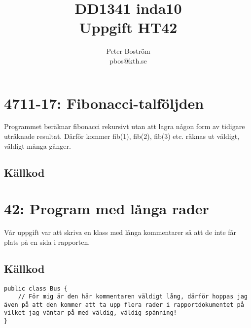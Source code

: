 \documentclass[a4paper]{article}
\author{Peter Boström \\ pbos@kth.se}
\title{DD1341 inda10 \\ Uppgift HT42}
\begin{document}
	\maketitle

	\section*{4711-17: Fibonacci-talföljden}
		Programmet beräknar fibonacci rekursivt utan att lagra någon form av tidigare uträknade resultat. Därför kommer fib(1), fib(2), fib(3) etc. räknas ut väldigt, väldigt många gånger.

		\subsection*{Källkod}

			
	\newpage
	\section*{42: Program med långa rader}
		Vår uppgift var att skriva en klass med långa kommentarer så att de inte får plats på en sida i rapporten.

		\subsection*{Källkod}
			\begin{lstlisting}
public class Bus {
	// För mig är den här kommentaren väldigt lång, därför hoppas jag även på att den kommer att ta upp flera rader i rapportdokumentet på vilket jag väntar på med väldig, väldig spänning!
}
			\end{lstlisting}
\end{document}
